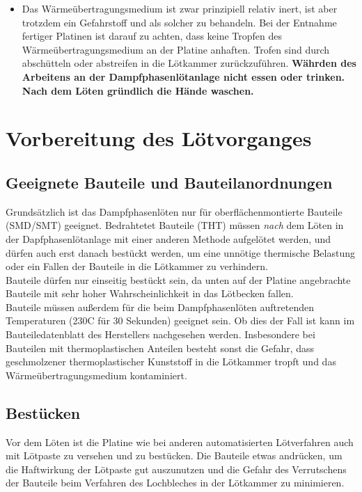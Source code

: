 \documentclass{\basedir/fablab-document}
\begin{document}
\begin{itemize}
	\item Das W{\"a}rme{\"u}bertragungsmedium ist zwar prinzipiell relativ inert, ist aber trotzdem ein Gefahrstoff und als solcher zu behandeln. Bei der Entnahme fertiger Platinen ist darauf zu achten, dass keine Tropfen des W{\"a}rme{\"u}bertragungsmedium an der Platine anhaften. Trofen sind durch absch{\"u}tteln oder abstreifen in die L{\"o}tkammer zur{\"u}ckzuf{\"u}hren. \textbf{Währden des Arbeitens an der Dampfphasenl{\"o}tanlage nicht essen oder trinken. Nach dem L{\"o}ten gr{\"u}ndlich die H{\"a}nde waschen.} 
	\end{itemize}
	
	\section{Vorbereitung des L{\"o}tvorganges}
	\subsection{Geeignete Bauteile und Bauteilanordnungen}
	
	
	Grunds{\"a}tzlich ist das Dampfphasenl{\"o}ten nur f{\"u}r oberfl{\"a}chenmontierte Bauteile (SMD/SMT) geeignet. Bedrahtetet Bauteile (THT) m{\"u}ssen \textit{nach} dem L{\"o}ten in der Dapfphasenl{\"o}tanlage mit einer anderen Methode aufgel{\"o}tet werden, und d{\"u}rfen auch erst danach best{\"u}ckt werden, um eine unn{\"o}tige thermische Belastung oder ein Fallen der Bauteile in die L{\"o}tkammer zu verhindern.\\

Bauteile d{\"u}rfen nur einseitig best{\"u}ckt sein, da unten auf der Platine angebrachte Bauteile mit sehr hoher Wahrscheinlichkeit in das L{\"o}tbecken fallen. \\

Bauteile m{\"u}ssen au{\ss}erdem f{\"u}r die beim Dampfphasenl{\"o}ten auftretenden Temperaturen (230\textdegree C f{\"u}r 30 Sekunden) geeignet sein. Ob dies der Fall ist kann im Bauteiledatenblatt des Herstellers nachgesehen werden. Insbesondere bei Bauteilen mit thermoplastischen Anteilen besteht sonst die Gefahr, dass geschmolzener thermoplastischer Kunststoff in die L{\"o}tkammer tropft und das W{\"a}rme{\"u}bertragungsmedium kontaminiert.


\subsection{Best{\"u}cken}

Vor dem L{\"o}ten ist die Platine wie bei anderen automatisierten L{\"o}tverfahren auch mit L{\"o}tpaste zu versehen und zu best{\"u}cken. Die Bauteile etwas andr{\"u}cken, um die Haftwirkung der L{\"o}tpaste gut auszunutzen und die Gefahr des Verrutschens der Bauteile beim Verfahren des Lochbleches in der L{\"o}tkammer zu minimieren.
\end{document}
